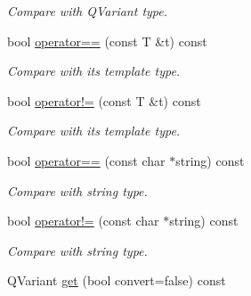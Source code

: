 \begin{DoxyCompactItemize}
\begin{DoxyCompactList}\small\item\em Compare with QVariant type. \item\end{DoxyCompactList}\item 
\hypertarget{classDQField_a239949c5298e739f37717652a326317b}{
bool \hyperlink{classDQField_a239949c5298e739f37717652a326317b}{operator==} (const T \&t) const }
\label{classDQField_a239949c5298e739f37717652a326317b}

\begin{DoxyCompactList}\small\item\em Compare with its template type. \item\end{DoxyCompactList}\item 
\hypertarget{classDQField_a3938d43781be5c4b3f8db191e0be8ea3}{
bool \hyperlink{classDQField_a3938d43781be5c4b3f8db191e0be8ea3}{operator!=} (const T \&t) const }
\label{classDQField_a3938d43781be5c4b3f8db191e0be8ea3}

\begin{DoxyCompactList}\small\item\em Compare with its template type. \item\end{DoxyCompactList}\item 
\hypertarget{classDQField_a77d0bd4973c3b15fcb352ce58f371394}{
bool \hyperlink{classDQField_a77d0bd4973c3b15fcb352ce58f371394}{operator==} (const char $\ast$string) const }
\label{classDQField_a77d0bd4973c3b15fcb352ce58f371394}

\begin{DoxyCompactList}\small\item\em Compare with string type. \item\end{DoxyCompactList}\item 
\hypertarget{classDQField_a6713be2b5fa4a2937265be13bbf4eb56}{
bool \hyperlink{classDQField_a6713be2b5fa4a2937265be13bbf4eb56}{operator!=} (const char $\ast$string) const }
\label{classDQField_a6713be2b5fa4a2937265be13bbf4eb56}

\begin{DoxyCompactList}\small\item\em Compare with string type. \item\end{DoxyCompactList}\item 
\hypertarget{classDQField_a17e36ac914ae0dd938f081f9ade514c7}{
QVariant \hyperlink{classDQField_a17e36ac914ae0dd938f081f9ade514c7}{get} (bool convert=false) const }
\label{classDQField_a17e36ac914ae0dd938f081f9ade514c7}


\end{DoxyCompactItemize}
